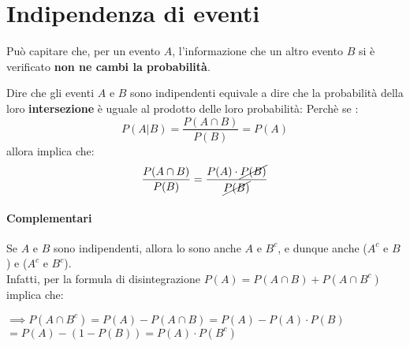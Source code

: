 \section{Indipendenza di eventi}
Può capitare che, per un evento $A$, l'informazione che un altro evento $B$ si è verificato
\textbf{non ne cambi la probabilità}.

Dire che gli eventi $A$ e $B$ sono indipendenti equivale a dire che la probabilità della loro \textbf{intersezione} è uguale
al prodotto delle loro probabilità:
Perchè se :
\[P(A|B) = \frac{P(A \cap B)}{P(B)} = P(A)\]
allora implica che:
\[ \frac{P(A \cap B)}{P(B)}= \frac{P(A) \cdot \cancel{P(B)}}{\cancel{P(B)}}\]
\paragraph{Complementari}
Se $A$ e $B$ sono indipendenti, allora lo sono anche $A$ e $B^c$, e dunque anche ($A^c$ e $B$) e ($A^c$ e $B^c$).
\\Infatti, per la formula di disintegrazione $P(A) = P(A\cap B) + P(A\cap B^c)$ implica che:
\begin{center}
    $\implies P(A\cap B^c) = P(A) - P(A\cap B) = P(A) - P(A) \cdot P(B)$
    \\$= P(A) - (1-P(B)) = P(A) \cdot P(B^c)$
\end{center} 

\paragraph{}



